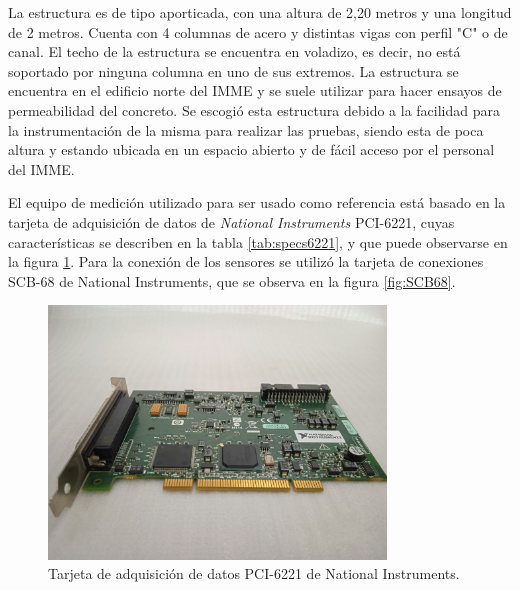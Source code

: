 La estructura es de tipo aporticada, con una altura de 2,20 metros y una longitud de 2 metros. Cuenta con 4 columnas de acero y distintas vigas con perfil "C" o de canal. El techo de la estructura se encuentra en voladizo, es decir, no está soportado por ninguna columna en uno de sus extremos. La estructura se encuentra en el edificio norte del IMME y se suele utilizar para hacer ensayos de permeabilidad del concreto. Se escogió esta estructura debido a la facilidad para la instrumentación de la misma para realizar las pruebas, siendo esta de poca altura y estando ubicada en un espacio abierto y de fácil acceso por el personal del IMME.

El equipo de medición utilizado para ser usado como referencia está basado en la tarjeta de adquisición de datos de \textit{National Instruments} PCI-6221, cuyas características se describen en la tabla \ref{tab:specs6221}, y que puede observarse en la figura  \ref{fig:DAQ6221}. Para la conexión de los sensores se utilizó la tarjeta de conexiones SCB-68 de National Instruments, que se observa en la figura \ref{fig:SCB68}.


\begin{figure}[H]
    \centering
    \includegraphics[width = 0.8\textwidth]{imagenes/cap3_resultados/Ensayos/NationalInstruments_PCI6221.jpg}
    \caption{Tarjeta de adquisición de datos PCI-6221 de National Instruments.}
    \label{fig:DAQ6221}
\end{figure}

